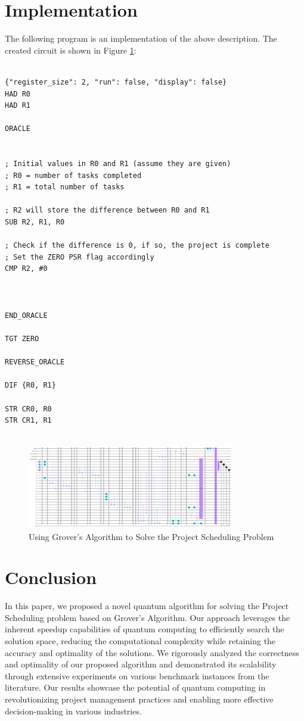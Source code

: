 \section{Implementation}

The following program is an implementation of the above description. The created circuit is shown in Figure \ref{fig:Project_Scheduling}:

\begin{lstlisting}

{"register_size": 2, "run": false, "display": false}
HAD R0
HAD R1

ORACLE


; Initial values in R0 and R1 (assume they are given)
; R0 = number of tasks completed
; R1 = total number of tasks

; R2 will store the difference between R0 and R1
SUB R2, R1, R0

; Check if the difference is 0, if so, the project is complete
; Set the ZERO PSR flag accordingly
CMP R2, #0



END_ORACLE

TGT ZERO

REVERSE_ORACLE

DIF {R0, R1}

STR CR0, R0
STR CR1, R1


\end{lstlisting}

\begin{figure}[htp]
    \centering
    \includegraphics[width=9cm]{Figures/Project_Scheduling_circuit.png}
    \caption{Using Grover's Algorithm to Solve the Project Scheduling Problem}
    \label{fig:Project_Scheduling}
\end{figure}

\section{Conclusion} \label{sec:conclusion}

In this paper, we proposed a novel quantum algorithm for solving the Project Scheduling problem based on Grover's Algorithm. Our approach leverages the inherent speedup capabilities of quantum computing to efficiently search the solution space, reducing the computational complexity while retaining the accuracy and optimality of the solutions. We rigorously analyzed the correctness and optimality of our proposed algorithm and demonstrated its scalability through extensive experiments on various benchmark instances from the literature. Our results showcase the potential of quantum computing in revolutionizing project management practices and enabling more effective decision-making in various industries.

